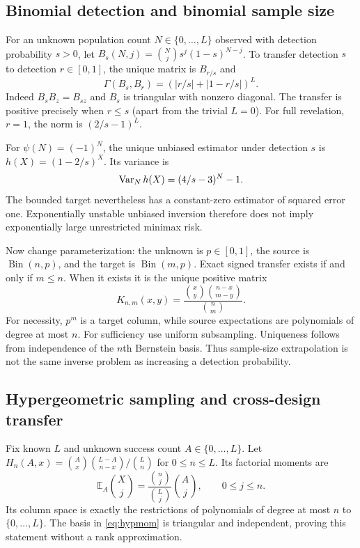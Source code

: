 \documentclass[11pt]{article}
\numberwithin{equation}{section}
\theoremstyle{definition}
\theoremstyle{remark}
\newcommand{\E}{\mathbb E}\newcommand{\Pp}{\mathbb P}\newcommand{\R}{\mathbb R}\newcommand{\N}{\mathbb N}
\newcommand{\Bin}{\operatorname{Bin}}\newcommand{\Hyp}{\operatorname{Hyp}}\newcommand{\osc}{\operatorname{osc}}\newcommand{\col}{\operatorname{col}}
\begin{document}
\subsection{Binomial detection and binomial sample size}
For an unknown population count $N\in\{0,\ldots,L\}$ observed with detection probability $s>0$, let $B_s(N,j)=\binom Nj s^j(1-s)^{N-j}$. To transfer detection $s$ to detection $r\in[0,1]$, the unique matrix is $B_{r/s}$ and
\begin{equation}\label{eq:binGamma}
 \Gamma(B_s,B_r)=(|r/s|+|1-r/s|)^L.
\end{equation}
Indeed $B_sB_z=B_{sz}$ and $B_s$ is triangular with nonzero diagonal. The transfer is positive precisely when $r\le s$ (apart from the trivial $L=0$). For full revelation, $r=1$, the norm is $(2/s-1)^L$.

\begin{example}\label{ex:parity}
For $\psi(N)=(-1)^N$, the unique unbiased estimator under detection $s$ is $h(X)=(1-2/s)^X$. Its variance is
\[
 \operatorname{Var}_Nh(X)=(4/s-3)^N-1.
\]
The bounded target nevertheless has a constant-zero estimator of squared error one. Exponentially unstable unbiased inversion therefore does not imply exponentially large unrestricted minimax risk.
\end{example}

Now change parameterization: the unknown is $p\in[0,1]$, the source is $\Bin(n,p)$, and the target is $\Bin(m,p)$. Exact signed transfer exists if and only if $m\le n$. When it exists it is the unique positive matrix
\begin{equation}\label{eq:subhyp}
 K_{n,m}(x,y)=\frac{\binom xy\binom{n-x}{m-y}}{\binom nm}.
\end{equation}
For necessity, $p^m$ is a target column, while source expectations are polynomials of degree at most $n$. For sufficiency use uniform subsampling. Uniqueness follows from independence of the $n$th Bernstein basis. Thus sample-size extrapolation is not the same inverse problem as increasing a detection probability.

\subsection{Hypergeometric sampling and cross-design transfer}\label{subsec:hyper}
Fix known $L$ and unknown success count $A\in\{0,\ldots,L\}$. Let $H_n(A,x)=\binom Ax\binom{L-A}{n-x}/\binom Ln$ for $0\le n\le L$. Its factorial moments are
\begin{equation}\label{eq:hypmom}
 \E_A\binom Xj=\frac{\binom nj}{\binom Lj}\binom Aj,\qquad 0\le j\le n.
\end{equation}
Its column space is exactly the restrictions of polynomials of degree at most $n$ to $\{0,\ldots,L\}$. The basis in \eqref{eq:hypmom} is triangular and independent, proving this statement without a rank approximation.
\end{document}
